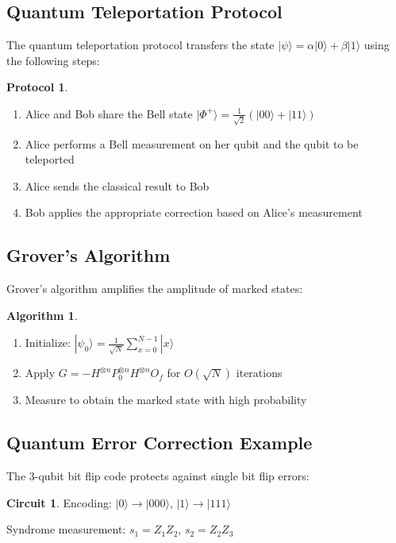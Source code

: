 \documentclass[12pt]{article}
\newcommand{\ket}[1]{|#1\rangle}
\newcommand{\qzero}{\ket{0}}
\newcommand{\qone}{\ket{1}}
\newcommand{\qpsi}{\ket{\psi}}
\newcommand{\bellphi}{\ket{\Phi^+}}
\newcommand{\hadamard}{H}
\newcommand{\proj}[1]{P_{#1}}
\newcommand{\tensor}{\otimes}
\newcommand{\oraclef}{O_f}
\theoremstyle{definition}
\newtheorem{algorithm}{Algorithm}[section]
\newtheorem{protocol}{Protocol}[section]
\newtheorem{circuit}{Circuit}[section]
\theoremstyle{remark}
\begin{document}
\subsection{Quantum Teleportation Protocol}
The quantum teleportation protocol transfers the state $\qpsi = \alpha\qzero + \beta\qone$ using the following steps:

\begin{protocol}
\begin{enumerate}
\item Alice and Bob share the Bell state $\bellphi = \frac{1}{\sqrt{2}}(\ket{00} + \ket{11})$
\item Alice performs a Bell measurement on her qubit and the qubit to be teleported
\item Alice sends the classical result to Bob
\item Bob applies the appropriate correction based on Alice's measurement
\end{enumerate}
\end{protocol}

\subsection{Grover's Algorithm}
Grover's algorithm amplifies the amplitude of marked states:

\begin{algorithm}
\begin{enumerate}
\item Initialize: $\ket{\psi_0} = \frac{1}{\sqrt{N}}\sum_{x=0}^{N-1}\ket{x}$
\item Apply $G = -\hadamard^{\tensor n}\proj{0}^{\tensor n}\hadamard^{\tensor n}\oraclef$ for $O(\sqrt{N})$ iterations
\item Measure to obtain the marked state with high probability
\end{enumerate}
\end{algorithm}

\subsection{Quantum Error Correction Example}
The 3-qubit bit flip code protects against single bit flip errors:

\begin{circuit}
Encoding: $\ket{0} \rightarrow \ket{000}$, $\ket{1} \rightarrow \ket{111}$

Syndrome measurement: $s_1 = Z_1Z_2$, $s_2 = Z_2Z_3$
\end{circuit}
\end{document}
